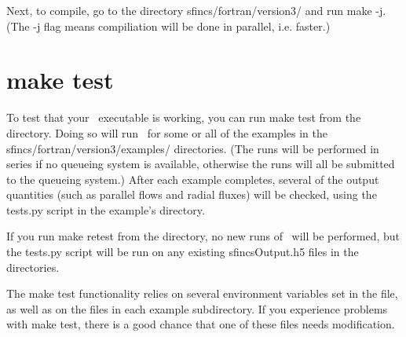 Next, to compile, go to the directory {\ttfamily sfincs/fortran/version3/} and run {\ttfamily make -j}.
(The {\ttfamily -j} flag means compiliation will be done in parallel, i.e. faster.)

\section{{\ttfamily make test}}
\label{sec:maketest}

To test that your \sfincs~executable is working, you can run {\ttfamily make test}
from the  directory.  Doing so will run
\sfincs~for some or all of the examples in the {\ttfamily sfincs/fortran/version3/examples/} directories.
(The runs will be performed in series if no queueing system is available, otherwise the runs will all
be submitted to the queueing system.)
After each example completes, several of the output quantities (such as parallel flows and radial fluxes)
will be checked, using the
{\ttfamily tests.py} script in the example's directory.

If you run {\ttfamily make retest} from the  directory,
no new runs of \sfincs~will be performed, but the {\ttfamily tests.py} script
will be run on any existing {\ttfamily sfincsOutput.h5} files in the  directories.

The {\ttfamily make test} functionality relies on several environment variables set in the
 file, as well as on the
 files in each example subdirectory.  If you experience
problems with  {\ttfamily make test}, there is a good chance that one of these files needs modification.
